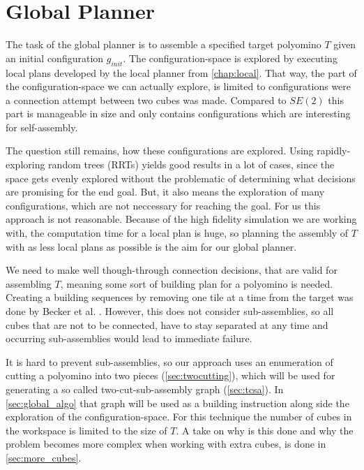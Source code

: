 \chapter{Global Planner}
\label{chap:global}

The task of the global planner is to assemble a specified target polyomino $T$ given an initial configuration $g_{init}$.
The configuration-space is explored by executing local plans developed by the local planner from \autoref{chap:local}.
That way, the part of the configuration-space we can actually explore, is limited to configurations were a connection attempt between two cubes was made.
Compared to $SE(2)$ this part is manageable in size and only contains configurations which are interesting for self-assembly.

The question still remains, how these configurations are explored.
Using rapidly-exploring random trees (RRTs) \cite{lavalle1998} yields good results in a lot of cases, since the space gets evenly explored without the problematic of determining what decisions are promising for the end goal.
But, it also means the exploration of many configurations, which are not neccessary for reaching the goal.
For us this approach is not reasonable. 
Because of the high fidelity simulation we are working with, the computation time for a local plan is huge, so planning the assembly of $T$ with as less local plans as possible is the aim for our global planner.

We need to make well though-through connection decisions, that are valid for assembling $T$, meaning some sort of building plan for a polyomino is needed.
Creating a building sequences by removing one tile at a time from the target was done by Becker et al. \cite{Becker2020}.
However, this does not consider sub-assemblies, so all cubes that are not to be connected, have to stay separated at any time and occurring sub-assemblies would lead to immediate failure.

It is hard to prevent sub-assemblies, so our approach uses an enumeration of cutting a polyomino into two pieces (\autoref{sec:twocutting}), which will be used for generating a so called two-cut-sub-assembly graph (\autoref{sec:tcsa}).
In \autoref{sec:global_algo} that graph will be used as a building instruction along side the exploration of the configuration-space.
For this technique the number of cubes in the workspace is limited to the size of $T$.
A take on why is this done and why the problem becomes more complex when working with extra cubes, is done in \autoref{sec:more_cubes}.


